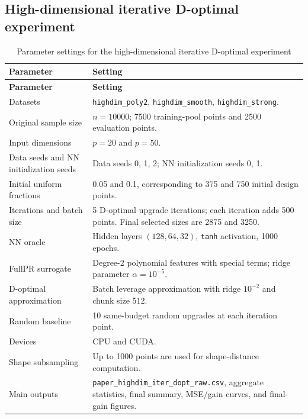 \documentclass[UTF8,a4paper,11pt]{ctexart}
\begin{document}
\subsection{High-dimensional iterative D-optimal experiment}

\begin{longtable}{L{0.30\textwidth}L{0.58\textwidth}}
\caption{Parameter settings for the high-dimensional iterative D-optimal experiment}
\label{tab:highdim-iter-parameters} \\
\toprule
\textbf{Parameter} & \textbf{Setting} \\
\midrule
\endfirsthead
\toprule
\textbf{Parameter} & \textbf{Setting} \\
\midrule
\endhead
\bottomrule
\endlastfoot

Datasets
& \texttt{highdim\_poly2}, \texttt{highdim\_smooth}, \texttt{highdim\_strong}. \\

Original sample size
& $n=10000$; 7500 training-pool points and 2500 evaluation points. \\

Input dimensions
& $p=20$ and $p=50$. \\

Data seeds and NN initialization seeds
& Data seeds 0, 1, 2; NN initialization seeds 0, 1. \\

Initial uniform fractions
& 0.05 and 0.1, corresponding to 375 and 750 initial design points. \\

Iterations and batch size
& 5 D-optimal upgrade iterations; each iteration adds 500 points. Final selected sizes are 2875 and 3250. \\

NN oracle
& Hidden layers $(128,64,32)$, \texttt{tanh} activation, 1000 epochs. \\

FullPR surrogate
& Degree-2 polynomial features with special terms; ridge parameter $\alpha=10^{-5}$. \\

D-optimal approximation
& Batch leverage approximation with ridge $10^{-2}$ and chunk size 512. \\

Random baseline
& 10 same-budget random upgrades at each iteration point. \\

Devices
& CPU and CUDA. \\

Shape subsampling
& Up to 1000 points are used for shape-distance computation. \\

Main outputs
& \texttt{paper\_highdim\_iter\_dopt\_raw.csv}, aggregate statistics, final summary, MSE/gain curves, and final-gain figures. \\

\end{longtable}
\end{document}
